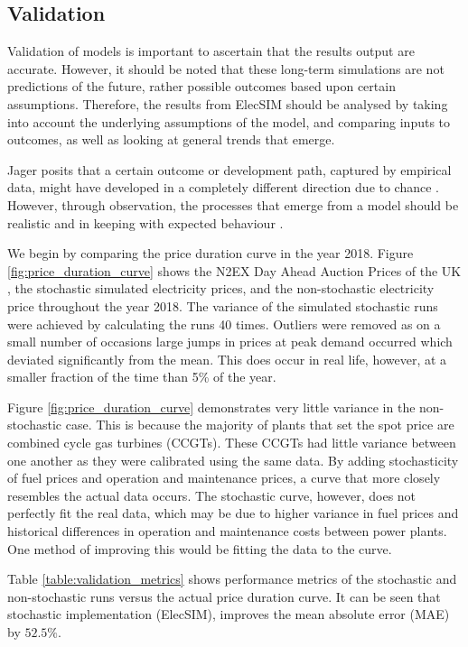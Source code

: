
\subsection{Validation} Validation of models is important to ascertain that the results output are accurate. However, it should be noted that these long-term simulations are not predictions of the future, rather possible outcomes based upon certain assumptions. Therefore, the results from ElecSIM should be analysed by taking into account the underlying assumptions of the model, and comparing inputs to outcomes, as well as looking at general trends that emerge.

Jager posits that a certain outcome or development path, captured by empirical data, might have developed in a completely different direction due to chance \cite{Jager2006a}. However, through observation, the processes that emerge from a model should be realistic and in keeping with expected behaviour \cite{Jager2006}.

We begin by comparing the price duration curve in the year 2018. Figure \ref{fig:price_duration_curve} shows the N2EX Day Ahead Auction Prices of the UK \cite{nordpool_2019}, the stochastic simulated electricity prices, and the non-stochastic electricity price throughout the year 2018. The variance of the simulated stochastic runs were achieved by calculating the runs 40 times. Outliers were removed as on a small number of occasions large jumps in prices at peak demand occurred which deviated significantly from the mean. This does occur in real life, however, at a smaller fraction of the time than 5\% of the year.

Figure \ref{fig:price_duration_curve} demonstrates very little variance in the non-stochastic case. This is because the majority of plants that set the spot price are combined cycle gas turbines (CCGTs). These CCGTs had little variance between one another as they were calibrated using the same data. By adding stochasticity of fuel prices and operation and maintenance prices, a curve that more closely resembles the actual data occurs. The stochastic curve, however, does not perfectly fit the real data, which may be due to higher variance in fuel prices and historical differences in operation and maintenance costs between power plants. One method of improving this would be fitting the data to the curve.

Table \ref{table:validation_metrics} shows performance metrics of the stochastic and non-stochastic runs versus the actual price duration curve. It can be seen that stochastic implementation (ElecSIM), improves the mean absolute error (MAE) by $52.5\%$.

